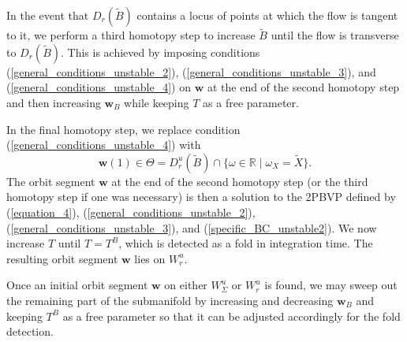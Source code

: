 \documentclass{ws-ijbc}
\begin{document}
In the event that $D_r(\widetilde{B})$ contains a locus of points at which the flow is tangent to it, we perform a third homotopy step to increase $\widetilde{B}$ until the flow is transverse to $D_r(\widetilde{B})$.  This is achieved by imposing conditions (\ref{general_conditions_unstable_2}), (\ref{general_conditions_unstable_3}), and (\ref{general_conditions_unstable_4}) on $\mathbf{w}$ at the end of the second homotopy step and then increasing $\mathbf{w}_B$ while keeping $T$ as a free parameter.

In the final homotopy step, we replace condition (\ref{general_conditions_unstable_4}) with 
	\begin{equation}
		\mathbf{w}(1) \in \Theta = D^u_r(\widetilde{B}) \cap \{ \omega \in \mathbb{R} \; | \; \omega_X = \widetilde{X} \}.
		\label{specific_BC_unstable2}
	\end{equation}
The orbit segment $\mathbf{w}$ at the end of the second homotopy step (or the third homotopy step if one was necessary) is then a solution to the 2PBVP defined by (\ref{equation_4}), (\ref{general_conditions_unstable_2}), (\ref{general_conditions_unstable_3}), and (\ref{specific_BC_unstable2}).    We now increase $T$ until $T=T^B$, which is detected as a fold in integration time.  The resulting orbit segment $\mathbf{w}$ lies on $W^u_r$.

Once an initial orbit segment $\mathbf{w}$ on either $W^u_\Sigma$ or $W^u_r$ is found, we may sweep out the remaining part of the submanifold by increasing and decreasing $\mathbf{w}_B$ and keeping $T^B$ as a free parameter so that it can be adjusted accordingly for the fold detection.
\end{document}
